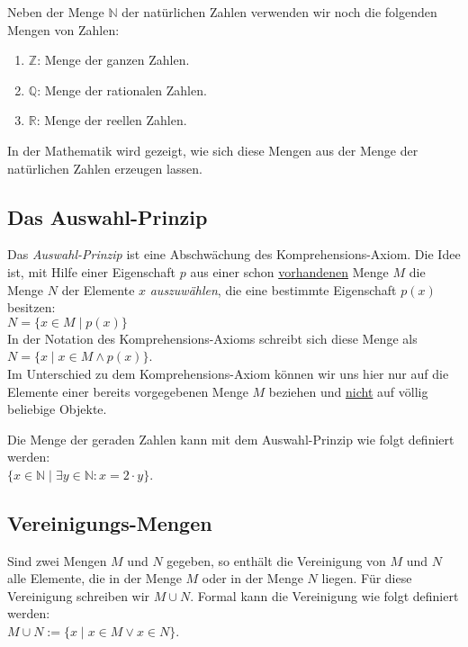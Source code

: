 Neben der Menge $\mathbb{N}$ der natürlichen Zahlen verwenden wir noch die folgenden
Mengen von Zahlen: 
\begin{enumerate}
\item $\mathbb{Z}$: Menge der ganzen Zahlen.
\item $\mathbb{Q}$: Menge der rationalen Zahlen.
\item $\mathbb{R}$: Menge der reellen Zahlen.
\end{enumerate}
In der Mathematik wird gezeigt, wie sich diese Mengen aus der Menge der natürlichen Zahlen
erzeugen lassen.

\subsection{Das Auswahl-Prinzip}
Das \emph{Auswahl-Prinzip} ist eine Abschwächung des Komprehensions-Axiom.  Die Idee
ist, mit Hilfe einer Eigenschaft $p$ aus einer schon \underline{vorhandenen} Menge $M$ die
Menge $N$ der  
Elemente $x$ \emph{auszuwählen}, die eine bestimmte Eigenschaft $p(x)$ besitzen: \\[0.2cm]
\hspace*{1.3cm} $N = \{ x\in M \;|\; p(x) \}$ \\[0.2cm]
In der Notation des Komprehensions-Axioms schreibt sich diese Menge als \\[0.2cm]
\hspace*{1.3cm} $N = \{ x \mid x \in M \wedge p(x) \}$. \\[0.2cm]
Im Unterschied zu dem Komprehensions-Axiom können wir uns hier nur auf die Elemente einer
bereits vorgegebenen Menge $M$ beziehen und \underline{nicht} auf völlig beliebige Objekte.

\example
Die Menge der geraden Zahlen kann mit dem Auswahl-Prinzip wie folgt definiert werden: \\[0.2cm]
\hspace*{1.3cm} $\{ x \in \mathbb{N} \;|\; \exists y\in \mathbb{N}: x = 2 \cdot y \}$.  \eox

\subsection{Vereinigungs-Mengen}
Sind zwei Mengen $M$ und $N$ gegeben, so enthält die Vereinigung von $M$ und $N$ alle Elemente, die 
 in der Menge $M$ oder in der Menge $N$ liegen.  Für diese Vereinigung schreiben wir $M \cup N$.
Formal kann die Vereinigung wie folgt definiert werden: \\[0.2cm]
\hspace*{1.3cm} $M \cup N := \{ x \;|\; x \in M \vee x \in N \}$. 
\vspace{0.2cm}

